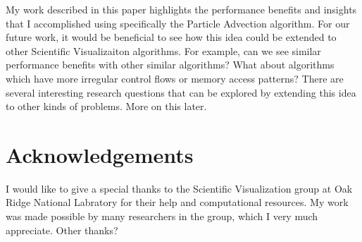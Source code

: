 \documentclass{IEEEtran}
\begin{document}
My work described in this paper highlights the performance benefits and insights that I accomplished using specifically the Particle Advection algorithm.
%
For our future work, it would be beneficial to see how this idea could be extended to other Scientific Visualizaiton algorithms.
%
For example, can we see similar performance benefits with other similar algorithms?
%
What about algorithms which have more irregular control flows or memory access patterns?
%
There are several interesting research questions that can be explored by extending this idea to other kinds of problems.
%
More on this later.
%
\section{Acknowledgements}
I would like to give a special thanks to the Scientific Visualization group at Oak Ridge National Labratory for their help and computational resources.
%
My work was made possible by many researchers in the group, which I very much appreciate.
%
Other thanks?

 

\end{document}
